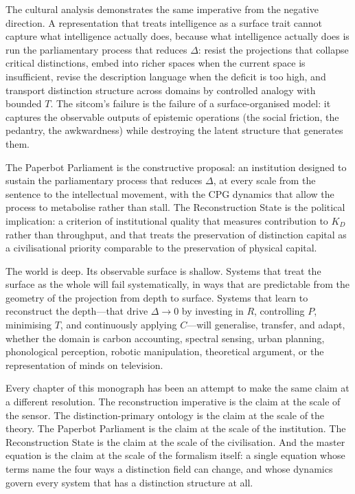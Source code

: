 \documentclass[12pt, letterpaper]{article}
\theoremstyle{remark}
\begin{document}
The cultural analysis demonstrates the same imperative from the negative
direction.  A representation that treats intelligence as a surface trait
cannot capture what intelligence actually does, because what intelligence
actually does is run the parliamentary process that reduces $\Delta$: resist
the projections that collapse critical distinctions, embed into richer spaces
when the current space is insufficient, revise the description language when
the deficit is too high, and transport distinction structure across domains
by controlled analogy with bounded $T$.  The sitcom's failure is the failure
of a surface-organised model: it captures the observable outputs of epistemic
operations (the social friction, the pedantry, the awkwardness) while
destroying the latent structure that generates them.

The Paperbot Parliament is the constructive proposal: an institution designed
to sustain the parliamentary process that reduces $\Delta$, at every scale
from the sentence to the intellectual movement, with the CPG dynamics that
allow the process to metabolise rather than stall.  The Reconstruction State
is the political implication: a criterion of institutional quality that
measures contribution to $K_D$ rather than throughput, and that treats the
preservation of distinction capital as a civilisational priority comparable
to the preservation of physical capital.

The world is deep.  Its observable surface is shallow.  Systems that treat
the surface as the whole will fail systematically, in ways that are
predictable from the geometry of the projection from depth to surface.
Systems that learn to reconstruct the depth---that drive $\Delta \to 0$ by
investing in $R$, controlling $P$, minimising $T$, and continuously applying
$C$---will generalise, transfer, and adapt, whether the domain is carbon
accounting, spectral sensing, urban planning, phonological perception, robotic
manipulation, theoretical argument, or the representation of minds on
television.

Every chapter of this monograph has been an attempt to make the same claim
at a different resolution.  The reconstruction imperative is the claim at
the scale of the sensor.  The distinction-primary ontology is the claim at
the scale of the theory.  The Paperbot Parliament is the claim at the scale
of the institution.  The Reconstruction State is the claim at the scale of
the civilisation.  And the master equation is the claim at the scale of the
formalism itself: a single equation whose terms name the four ways a
distinction field can change, and whose dynamics govern every system that
has a distinction structure at all.
\end{document}
